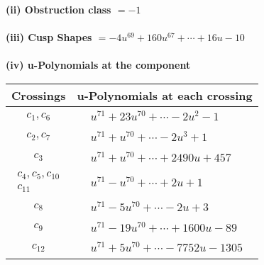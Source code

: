 \documentclass[1p]{elsarticle_modified}
\theoremstyle{definition}
\begin{document}
\flushleft \textbf{(ii) Obstruction class $= -1$}\\~\\
\flushleft \textbf{(iii) Cusp Shapes $= -4 u^{69}+160 u^{67}+\cdots+16 u-10$}\\~\\
\newpage\renewcommand{\arraystretch}{1}
\flushleft \textbf{(iv) u-Polynomials at the component}\newline \\
\begin{tabular}{m{50pt}|m{274pt}}
Crossings & \hspace{64pt}u-Polynomials at each crossing \\
\hline $$\begin{aligned}c_{1},c_{6}\end{aligned}$$&$\begin{aligned}
&u^{71}+23 u^{70}+\cdots-2 u^2-1
\end{aligned}$\\
\hline $$\begin{aligned}c_{2},c_{7}\end{aligned}$$&$\begin{aligned}
&u^{71}+u^{70}+\cdots-2 u^3+1
\end{aligned}$\\
\hline $$\begin{aligned}c_{3}\end{aligned}$$&$\begin{aligned}
&u^{71}+u^{70}+\cdots+2490 u+457
\end{aligned}$\\
\hline $$\begin{aligned}c_{4},c_{5},c_{10}\\c_{11}\end{aligned}$$&$\begin{aligned}
&u^{71}- u^{70}+\cdots+2 u+1
\end{aligned}$\\
\hline $$\begin{aligned}c_{8}\end{aligned}$$&$\begin{aligned}
&u^{71}-5 u^{70}+\cdots-2 u+3
\end{aligned}$\\
\hline $$\begin{aligned}c_{9}\end{aligned}$$&$\begin{aligned}
&u^{71}-19 u^{70}+\cdots+1600 u-89
\end{aligned}$\\
\hline $$\begin{aligned}c_{12}\end{aligned}$$&$\begin{aligned}
&u^{71}+5 u^{70}+\cdots-7752 u-1305
\end{aligned}$\\
\hline
\end{tabular}\\~\\
\end{document}
